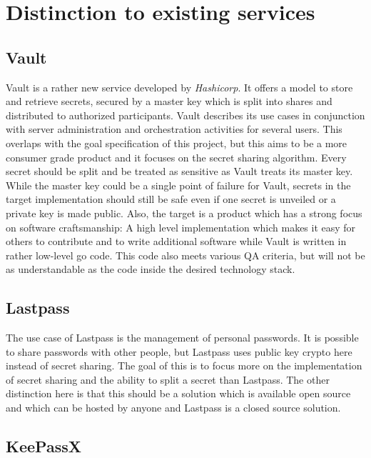 \chapter{Distinction to existing services}

\section{Vault}

Vault is a rather new service developed by \textit{Hashicorp}.
It offers a model to store and retrieve secrets, secured by a
master key which is split into shares and distributed to authorized
participants. Vault describes its use cases in conjunction with
server administration and orchestration activities for several users.
This overlaps with the goal specification of this project, but this aims
to be a more
consumer grade product and it focuses on the secret sharing algorithm.
Every secret should be split and be treated
as sensitive as Vault treats its master key. While the master key
could be a single point of failure for Vault, secrets in the target implementation
should still be safe even if one secret is unveiled or a private key
is made public. Also, the target is a product which has a strong focus
on software craftsmanship: A high level implementation which
makes it easy for others to contribute and to write additional
software while Vault is written in rather low-level go code. This
code also meets various QA criteria, but will not be as understandable
as the code inside the desired technology stack.
\cite{vault}

\section{Lastpass}

The use case of Lastpass is the management of personal passwords.
It is possible to share passwords with other people, but Lastpass
uses public key crypto here instead of secret sharing. The goal of this
is to focus more on the implementation of secret sharing
and the ability to split a secret than Lastpass. The other distinction
here is that this should be a solution which is available open source and
which can be hosted by anyone and Lastpass is a closed source
solution.

\section{KeePassX}

